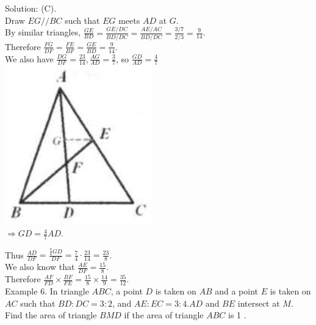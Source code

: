 \documentclass[10pt]{article}
\begin{document}
Solution: (C).\\
Draw \(E G / / B C\) such that \(E G\) meets \(A D\) at \(G\).\\
By similar triangles, \(\frac{G E}{B D}=\frac{G E / D C}{B D / D C}=\frac{A E / A C}{B D / D C}=\frac{3 / 7}{2 / 3}=\frac{9}{14}\).\\
Therefore \(\frac{F G}{D F}=\frac{F E}{B F}=\frac{G E}{B D}=\frac{9}{14}\).\\
We also have \(\frac{D G}{D F}=\frac{23}{14}, \frac{A G}{A D}=\frac{3}{7}\), so \(\frac{G D}{A D}=\frac{4}{7}\)\\
\includegraphics[max width=\textwidth, center]{2025_04_17_97bc1f7e44d93c271a88g-106(1)}\\
\(\Rightarrow G D=\frac{4}{7} A D\).


Thus \(\frac{A D}{D F}=\frac{\frac{7}{4} G D}{D F}=\frac{7}{4} \cdot \frac{23}{14}=\frac{23}{8}\).\\
We also know that \(\frac{A E}{D F}=\frac{15}{8}\).\\
Therefore \(\frac{A F}{F D} \times \frac{B F}{F E}=\frac{15}{8} \times \frac{14}{9}=\frac{35}{12}\).\\
Example 6. In triangle \(A B C\), a point \(D\) is taken on \(A B\) and a point \(E\) is taken on \(A C\) such that \(B D: D C=3: 2\), and \(A E: E C=3: 4 . A D\) and \(B E\) intersect at \(M\). Find the area of triangle \(B M D\) if the area of triangle \(A B C\) is 1 .
\end{document}
